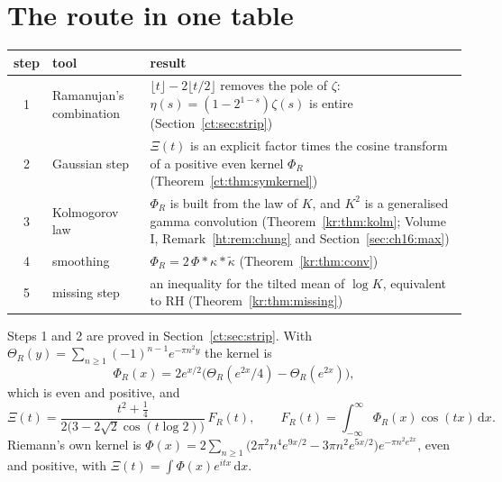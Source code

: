 \section{The route in one table}\label{kr:sec:route}
\begin{center}
\small
\begin{tabular}{cp{}p{}}
\toprule
step & tool & result\\
\midrule
1 & Ramanujan's combination & $\lfloor t\rfloor-2\lfloor t/2\rfloor$ removes the pole of $\zeta$: $\eta(s)=(1-2^{1-s})\zeta(s)$ is entire (Section~\ref{ct:sec:strip})\\
2 & Gaussian step & $\Xi(t)$ is an explicit factor times the cosine transform of a positive even kernel $\Phi_R$ (Theorem~\ref{ct:thm:symkernel})\\
3 & Kolmogorov law & $\Phi_R$ is built from the law of $K$, and $K^2$ is a generalised gamma convolution (Theorem~\ref{kr:thm:kolm}; Volume I, Remark~\ref{ht:rem:chung} and Section~\ref{sec:ch16:max})\\
4 & smoothing & $\Phi_R=2\,\Phi*\kappa*\tilde\kappa$ (Theorem~\ref{kr:thm:conv})\\
5 & missing step & an inequality for the tilted mean of $\log K$, equivalent to RH (Theorem~\ref{kr:thm:missing})\\
\bottomrule
\end{tabular}
\end{center}
Steps 1 and 2 are proved in Section~\ref{ct:sec:strip}. With $\Theta_R(y)=\sum_{n\ge1}(-1)^{n-1}e^{-\pi n^2y}$ the kernel is
\[
\Phi_R(x)=2e^{x/2}\big(\Theta_R(e^{2x}/4)-\Theta_R(e^{2x})\big),
\]
which is even and positive, and
\begin{equation}\label{kr:eq:kernel}
\Xi(t)=\frac{t^2+\frac14}{2\big(3-2\sqrt2\cos(t\log2)\big)}\,F_R(t),\qquad F_R(t)=\int_{-\infty}^\infty\Phi_R(x)\cos(tx)\,\mathrm dx.
\end{equation}
Riemann's own kernel is $\Phi(x)=2\sum_{n\ge1}\big(2\pi^2n^4e^{9x/2}-3\pi n^2e^{5x/2}\big)e^{-\pi n^2e^{2x}}$, even and positive, with $\Xi(t)=\int\Phi(x)e^{itx}\,\mathrm dx$.

